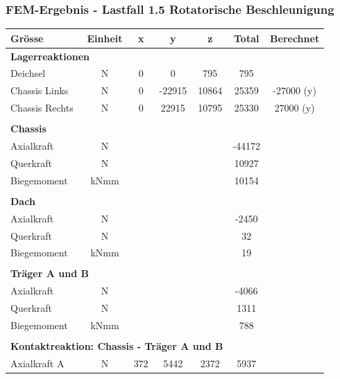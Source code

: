 

  \subsubsection{FEM-Ergebnis - Lastfall 1.5 Rotatorische Beschleunigung}
  \begin{table}[H]
  \centering
  \begin{tabular}{lcccccc}
  Grösse	&	Einheit	&	x	&	y	&	z	&	Total	&	Berechnet	\\	\hline
  \multicolumn{5}{l}{\textbf{Lagerreaktionen}}									&		&		\\	\thickhline
  Deichsel	&	N	&	0	&	0	&	795	&	795	&		\\
  Chassis Links	&	N	&	0	&	-22915	&	10864	&	25359	&	-27000 (y)	\footnotemark \\
  Chassis Rechts	&	N	&	0	&	22915	&	10795	&	25330	&	27000 (y)	\\	\hline	\\
  \multicolumn{5}{l}{\textbf{Chassis}}									&		&		\\	\thickhline
  Axialkraft	&	N	&		&		&		&	-44172	&		\\
  Querkraft	&	N	&		&		&		&	10927	&		\\
  Biegemoment	&	kNmm	&		&		&		&	10154	&		\\	\hline	\\
  \multicolumn{5}{l}{\textbf{Dach}}									&		&		\\	\thickhline
  Axialkraft	&	N	&		&		&		&	-2450	&		\\
  Querkraft	&	N	&		&		&		&	32	&		\\
  Biegemoment	&	kNmm	&		&		&		&	19	&		\\	\hline	\\
  \multicolumn{5}{l}{\textbf{Träger A und B}}													\\	\thickhline
  Axialkraft	&	N	&		&		&		&	-4066	&		\\
  Querkraft	&	N	&		&		&		&	1311	&		\\
  Biegemoment	&	kNmm	&		&		&		&	788	&		\\	\hline	\\
  \multicolumn{5}{l}{\textbf{Kontaktreaktion: Chassis - Träger A und B}}									&		&		\\	\thickhline
  Axialkraft A	&	N	&	372	&	5442	&	2372	&	5937	&		\\

\end{tabular}
\end{table}
